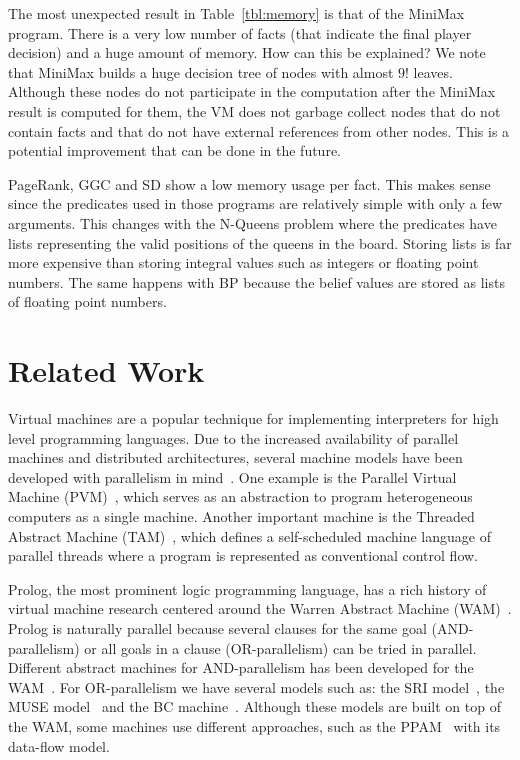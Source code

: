\documentclass{sigplanconf}
\begin{document}
The most unexpected result in Table~\ref{tbl:memory} is that of the MiniMax program. There is a
very low number of facts (that indicate the final player decision) and a huge
amount of memory. How can this be explained? We note that MiniMax builds a huge
decision tree of nodes with almost $9!$ leaves. Although these nodes do not participate
in the computation after the MiniMax result is computed for them, the VM does not garbage collect
nodes that do not contain facts and that do not have external references from other nodes.
This is a potential improvement that can be done in the future.

PageRank, GGC and SD show a low memory usage per fact. This makes sense since the predicates
used in those programs are relatively simple with only a few arguments.
This changes with the N-Queens problem where the predicates have lists representing the valid
positions of the queens in the board. Storing lists is far more expensive than storing integral
values such as integers or floating point numbers. The same happens with BP because
the belief values are stored as lists of floating point numbers.
 
\makeatletter{}\section{Related Work}
\label{related_work}

Virtual machines are a popular technique for implementing interpreters
for high level programming languages.  Due to the increased
availability of parallel machines and distributed architectures,
several machine models have been developed with parallelism in
mind~\cite{Kara:1997:AMM:265274}.  One example is the
Parallel Virtual Machine (PVM)~\cite{Sunderam90pvm:a}, which serves as
an abstraction to program heterogeneous computers as a single
machine. Another important machine is the Threaded Abstract Machine
(TAM)~\cite{CullerGSvE93,goldstein-tr94}, which defines a
self-scheduled machine language of parallel threads where a program is
represented as conventional control flow.

Prolog, the most prominent logic programming language, has a rich
history of virtual machine research centered around the Warren
Abstract Machine (WAM)~\cite{AICPub641:1983}. 
Prolog is naturally parallel because several clauses for the same goal
(AND-parallelism) or all goals in a clause (OR-parallelism) can be
tried in parallel. Different abstract machines for AND-parallelism has
been developed for the
WAM~\cite{Hermenegildo:1986:AMB:913061,Lin:1988:AEL:900478}.  For
OR-parallelism we have several models such as: the SRI
model~\cite{Warren:1987:OEM:67683.67699}, the MUSE model~\cite{Ali:1990fk} and the
BC machine~\cite{Ali88}. Although these models are built on top of the WAM,
some machines use different approaches, such as the
PPAM~\cite{Kacsuk:1990:EMP:533578} with its
data-flow model.
\end{document}
